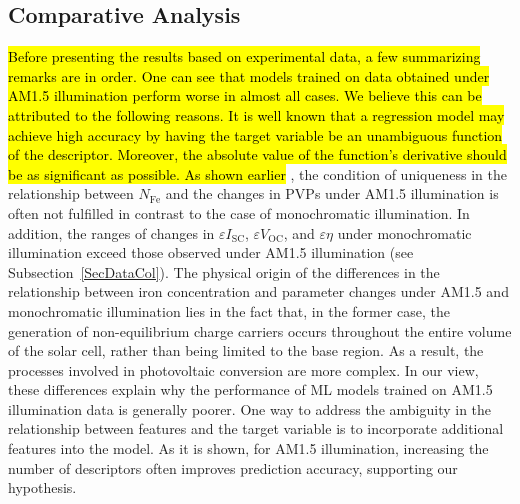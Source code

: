 \documentclass[a4paper,fleqn,draft]{cas-sc}
\begin{document}
\begin{tcolorbox}
\textcolor[rgb]{1.00,0.07,0.00}{
\subsection{Comparative Analysis}
}\end{tcolorbox}

\textcolor[rgb]{1.00,0.07,0.00}{
\hl{
Before presenting the results based on experimental data, a few summarizing remarks are in order.
One can see that models trained on data obtained under AM1.5 illumination perform worse in almost all cases.
We believe this can be attributed to the following reasons.
It is well known that a regression model may  achieve high accuracy
by having the target variable be an unambiguous function of the descriptor.
Moreover, the absolute value of the function’s derivative should be as significant as possible.
As shown earlier}  \cite{Olikh2025MSEB}, the condition of uniqueness in the relationship between $N_\mathrm{Fe}$ and
the changes in PVPs under AM1.5 illumination is often not fulfilled in contrast to the case of monochromatic illumination.
In addition, the ranges of changes in $\varepsilon I_\mathrm{SC}$, $\varepsilon V_\mathrm{OC}$, and $\varepsilon \eta$
under monochromatic illumination exceed those observed under AM1.5 illumination (see Subsection~\ref{SecDataCol}).
The physical origin of the differences in the relationship between iron concentration and
parameter changes under AM1.5 and monochromatic illumination lies in the fact that,
in the former case, the generation of non-equilibrium charge carriers occurs throughout the
entire volume of the solar cell, rather than being limited to the base region.
As a result, the processes involved in photovoltaic conversion are more complex.
In our view, these differences explain why the performance of ML models trained on AM1.5 illumination data is generally poorer.
One way to address the ambiguity in the relationship between features and the target variable
is to incorporate additional features into the model.
As it is shown, for AM1.5 illumination, increasing the number of descriptors often improves prediction accuracy, supporting our hypothesis.
}
\end{document}
